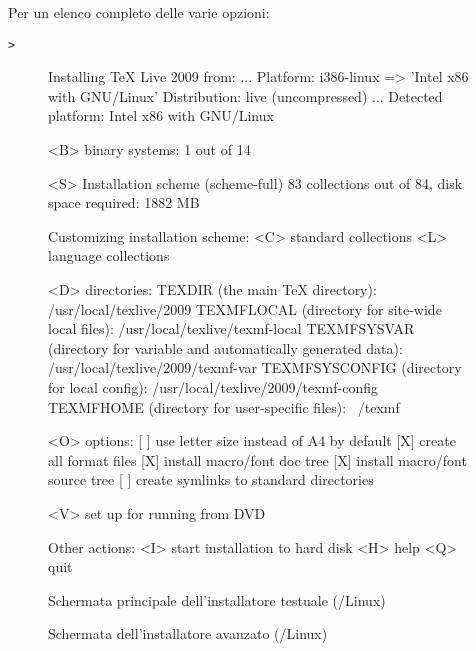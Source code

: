 \documentclass{article}
\begin{document}
Per un elenco completo delle varie opzioni:
\begin{alltt}
> 
\end{alltt}

\begin{figure}[tb]
\begin{boxedverbatim}
Installing TeX Live 2009 from: ...
Platform: i386-linux => 'Intel x86 with GNU/Linux'
Distribution: live (uncompressed)
...
 Detected platform: Intel x86 with GNU/Linux

 <B> binary systems: 1 out of 14

 <S> Installation scheme (scheme-full)
     83 collections out of 84, disk space required: 1882 MB

 Customizing installation scheme:
   <C> standard collections
   <L> language collections

 <D> directories:
   TEXDIR (the main TeX directory):
     /usr/local/texlive/2009
   TEXMFLOCAL (directory for site-wide local files):
     /usr/local/texlive/texmf-local
   TEXMFSYSVAR (directory for variable and automatically generated data):
     /usr/local/texlive/2009/texmf-var
   TEXMFSYSCONFIG (directory for local config):
     /usr/local/texlive/2009/texmf-config
   TEXMFHOME (directory for user-specific files):
     ~/texmf

 <O> options:
   [ ] use letter size instead of A4 by default
   [X] create all format files
   [X] install macro/font doc tree
   [X] install macro/font source tree
   [ ] create symlinks to standard directories

 <V> set up for running from DVD

Other actions:
 <I> start installation to hard disk
 <H> help
 <Q> quit
\end{boxedverbatim}
\caption{Schermata principale dell'installatore testuale
  (\GNU/Linux)}\label{fig:text-main}
\end{figure}

\begin{figure}[tb]
\caption{Schermata dell'installatore avanzato \GUI{}
  (\GNU/Linux)}\label{fig:gui-main}
\end{figure}
\end{document}
